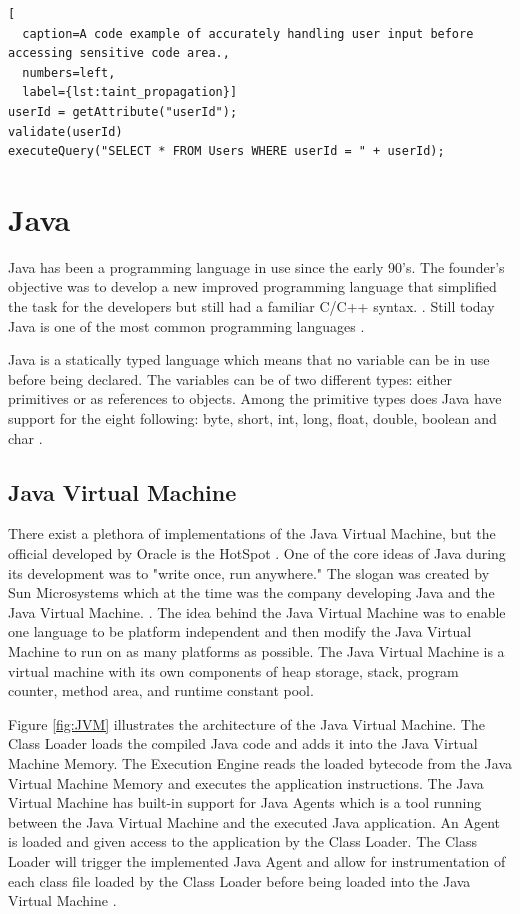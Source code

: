 \hfill
\begin{minipage}[H]{\linewidth}
\begin{lstlisting}[
  caption=A code example of accurately handling user input before accessing sensitive code area.,
  numbers=left,
  label={lst:taint_propagation}]
userId = getAttribute("userId");
validate(userId)
executeQuery("SELECT * FROM Users WHERE userId = " + userId);
\end{lstlisting}
\end{minipage}
\hfill



\section{Java}
\label{JavaInstrumentation}
Java has been a programming language in use since the early 90's. The founder's objective was to develop a new improved programming language that simplified the task for the developers but still had a familiar C/C++ syntax. \parencite{OracleVoice}. Still today Java is one of the most common programming languages \parencite{octoverse}.

Java is a statically typed language which means that no variable can be in use before being declared. The variables can be of two different types: either primitives or as references to objects. Among the primitive types does Java have support for the eight following: byte, short, int, long, float, double, boolean and char \parencite{primjav}.



\subsection{Java Virtual Machine}
There exist a plethora of implementations of the Java Virtual Machine, but the official developed by Oracle is the HotSpot \parencite{hotSpot}. One of the core ideas of Java during its development was to "write once, run anywhere." The slogan was created by Sun Microsystems which at the time was the company developing Java and the Java Virtual Machine. \parencite{Craig_2006}. The idea behind the Java Virtual Machine was to enable one language to be platform independent and then modify the Java Virtual Machine to run on as many platforms as possible. The Java Virtual Machine is a virtual machine with its own components of heap storage, stack, program counter, method area, and runtime constant pool.

Figure \ref{fig:JVM} illustrates the architecture of the Java Virtual Machine. The Class Loader loads the compiled Java code and adds it into the Java Virtual Machine Memory. The Execution Engine reads the loaded bytecode from the Java Virtual Machine Memory and executes the application instructions. The Java Virtual Machine has built-in support for Java Agents which is a tool running between the Java Virtual Machine and the executed Java application. An Agent is loaded and given access to the application by the Class Loader. The Class Loader will trigger the implemented Java Agent and allow for instrumentation of each class file loaded by the Class Loader before being loaded into the Java Virtual Machine \parencite{venners_1999, instru}.

